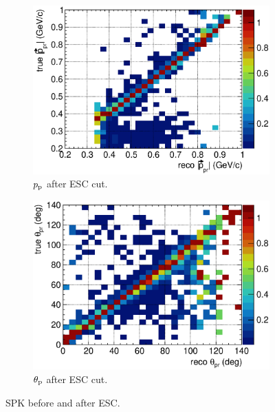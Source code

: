 \begin{figure}
        \begin{subfigure}[b]{\dbfigwid\textwidth}
             \centering
             \includegraphics[width=\textwidth]{figures/sel/p_pr_colnor_resmat_al14.eps}
             \caption{$p_\textrm{p}$ after ESC cut.}
             \label{subfig:esc-ppr-afesc}
        \end{subfigure}
        \begin{subfigure}[b]{\dbfigwid\textwidth}
             \centering
             \includegraphics[width=\textwidth]{figures/sel/theta_pr_colnor_resmat_al14.eps}
             \caption{$\theta_\textrm{p}$ after ESC cut.}
             \label{subfig:esc-tpr-afesc}
        \end{subfigure}
        \caption{SPK before and after ESC.}
        \label{fig:esc-spk}
  \end{figure}

